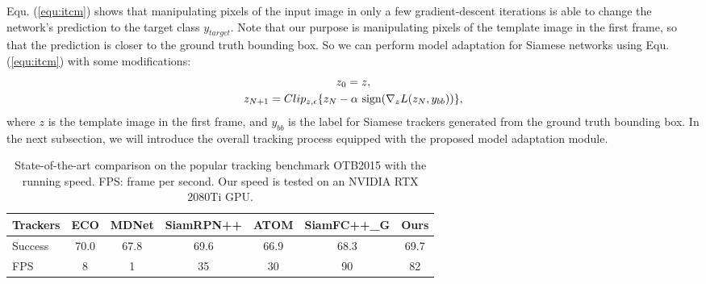 Equ. (\ref{equ:itcm}) shows that manipulating pixels of the input image in only a few gradient-descent iterations is able to change the network's prediction to the target class $y_{target}$. Note that our purpose is manipulating pixels of the template image in the first frame, so that the prediction is closer to the ground truth bounding box. So we can perform model adaptation for Siamese networks using Equ. (\ref{equ:itcm}) with some modifications:
\vspace{-0.1cm}
\begin{equation}
    \begin{gathered}
        z_0 = z,\\
        z_{N+1} = Clip_{z,\epsilon}\{z_N -\alpha \text{ sign}(\nabla_z L(z_N,y_{bb}))\},
    \end{gathered}
    \vspace{-0.1cm}
    \label{equ:adaptaion}
\end{equation}
where $z$ is the template image in the first frame, and $y_{bb}$ is the label for Siamese trackers generated from the ground truth bounding box. In the next subsection, we will introduce the overall tracking process equipped with the proposed model adaptation module.

\begin{table}[t]
\renewcommand\arraystretch{0.8}
\caption{State-of-the-art comparison on the popular tracking benchmark OTB2015 with the running speed. FPS: frame per second. Our speed is tested on an NVIDIA RTX 2080Ti GPU.}
\vspace{-0.3cm}
\setlength{\tabcolsep}{3pt}
\begin{center}
\begin{tabular}{l | c c c c c c}
\toprule
Trackers & ECO & MDNet & SiamRPN++ & ATOM & SiamFC++\_G & Ours \\
\midrule
Success & 70.0 & 67.8  & 69.6      & 66.9      & 68.3       & 69.7 \\
FPS     & 8    & 1     & 35        & 30       & 90         & 82  \\
\bottomrule
\end{tabular}
\end{center}
\label{table:otb}
\vspace{-0.2cm}
\end{table}

